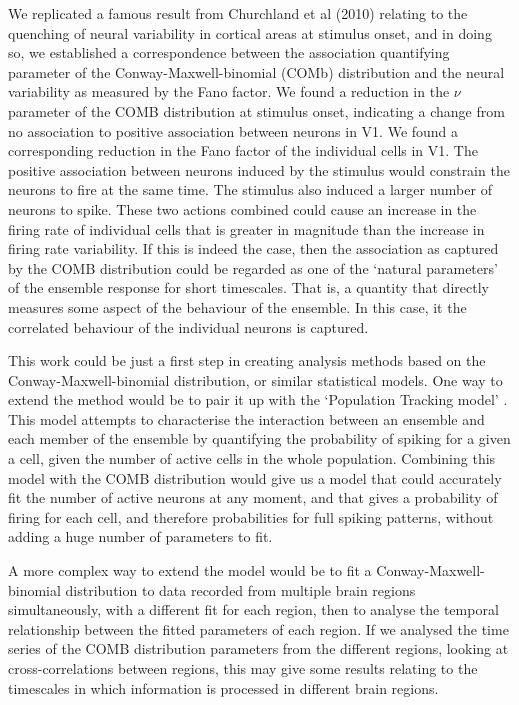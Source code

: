 We replicated a famous result from Churchland et al (2010) relating to the quenching of neural variability in cortical areas at stimulus onset, and in doing so, we established a correspondence between the association quantifying parameter of the Conway-Maxwell-binomial (COMb) distribution and the neural variability as measured by the Fano factor. We found a reduction in the $\nu$ parameter of the COMB distribution at stimulus onset, indicating a change from no association to positive association between neurons in V1. We found a corresponding reduction in the Fano factor of the individual cells in V1. The positive association between neurons induced by the stimulus would constrain the neurons to fire at the same time. The stimulus also induced a larger number of neurons to spike. These two actions combined could cause an increase in the firing rate of individual cells that is greater in magnitude than the increase in firing rate variability. If this is indeed the case, then the association as captured by the COMB distribution could be regarded as one of the `natural parameters' of the ensemble response for short timescales. That is, a quantity that directly measures some aspect of the behaviour of the ensemble. In this case, it the correlated behaviour of the individual neurons is captured.

This work could be just a first step in creating analysis methods based on the Conway-Maxwell-binomial distribution, or similar statistical models. One way to extend the method would be to pair it up with the `Population Tracking model' \parencite{odonnell}. This model attempts to characterise the interaction between an ensemble and each member of the ensemble by quantifying the probability of spiking for a given a cell, given the number of active cells in the whole population. Combining this model with the COMB distribution would give us a model that could accurately fit the number of active neurons at any moment, and that gives a probability of firing for each cell, and therefore probabilities for full spiking patterns, without adding a huge number of parameters to fit.

A more complex way to extend the model would be to fit a Conway-Maxwell-binomial distribution to data recorded from multiple brain regions simultaneously, with a different fit for each region, then to analyse the temporal relationship between the fitted parameters of each region. If we analysed the time series of the COMB distribution parameters from the different regions, looking at cross-correlations between regions, this may give some results relating to the timescales in which information is processed in different brain regions.


